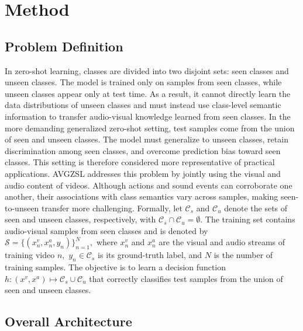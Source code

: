 
\section{Method}\label{sec:method}

\subsection{Problem Definition}\label{sec:problem-definition}

In zero-shot learning, classes are divided into two disjoint sets: seen classes and unseen classes. The model is trained only on samples from seen classes, while unseen classes appear only at test time. As a result, it cannot directly learn the data distributions of unseen classes and must instead use class-level semantic information to transfer audio-visual knowledge learned from seen classes. In the more demanding generalized zero-shot setting, test samples come from the union of seen and unseen classes. The model must generalize to unseen classes, retain discrimination among seen classes, and overcome prediction bias toward seen classes. This setting is therefore considered more representative of practical applications. AVGZSL addresses this problem by jointly using the visual and audio content of videos. Although actions and sound events can corroborate one another, their associations with class semantics vary across samples, making seen-to-unseen transfer more challenging. Formally, let ${\mathcal{C}}_{s}$ and ${\mathcal{C}}_{u}$ denote the sets of seen and unseen classes, respectively, with ${\mathcal{C}}_{s}\cap {\mathcal{C}}_{u}=\emptyset .$ The training set contains audio-visual samples from seen classes and is denoted by $\mathcal{S}=\{({x}_{n}^{v},{x}_{n}^{a},{y}_{n}){\}}_{n=1}^{N},$ where ${x}_{n}^{v}$ and ${x}_{n}^{a}$ are the visual and audio streams of training video $n,$ ${y}_{n}\in {\mathcal{C}}_{s}$ is its ground-truth label, and $N$ is the number of training samples. The objective is to learn a decision function $h:({x}^{v},{x}^{a})\mapsto {\mathcal{C}}_{s}\cup {\mathcal{C}}_{u}$ that correctly classifies test samples from the union of seen and unseen classes.

\subsection{Overall Architecture}\label{sec:overall-architecture}

